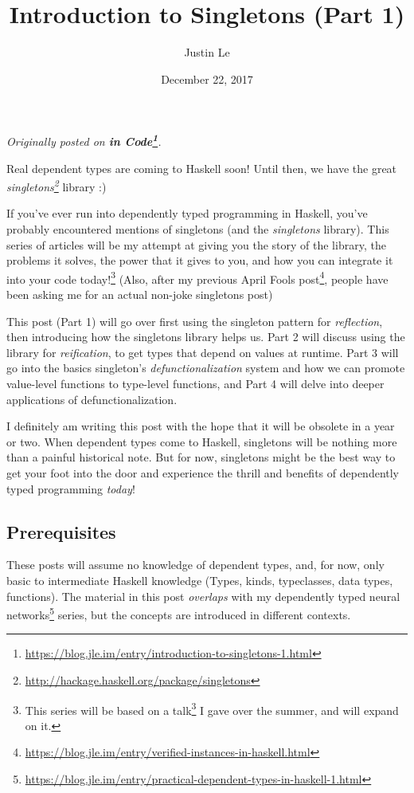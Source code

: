 \documentclass[]{article}
\title{Introduction to Singletons (Part 1)}
\author{Justin Le}
\date{December 22, 2017}
\renewcommand{\href}[2]{#2\footnote{\url{#1}}}
\begin{document}
\maketitle

\emph{Originally posted on
\textbf{\href{https://blog.jle.im/entry/introduction-to-singletons-1.html}{in
Code}}.}

Real dependent types are coming to Haskell soon! Until then, we have the great
\emph{\href{http://hackage.haskell.org/package/singletons}{singletons}} library
:)

If you've ever run into dependently typed programming in Haskell, you've
probably encountered mentions of singletons (and the \emph{singletons} library).
This series of articles will be my attempt at giving you the story of the
library, the problems it solves, the power that it gives to you, and how you can
integrate it into your code today!\footnote{This series will be based on
  \href{http://talks.jle.im/lambdaconf-2017/singletons/}{a talk} I gave over the
  summer, and will expand on it.} (Also, after
\href{https://blog.jle.im/entry/verified-instances-in-haskell.html}{my previous
April Fools post}, people have been asking me for an actual non-joke singletons
post)

This post (Part 1) will go over first using the singleton pattern for
\emph{reflection}, then introducing how the singletons library helps us. Part 2
will discuss using the library for \emph{reification}, to get types that depend
on values at runtime. Part 3 will go into the basics singleton's
\emph{defunctionalization} system and how we can promote value-level functions
to type-level functions, and Part 4 will delve into deeper applications of
defunctionalization.

I definitely am writing this post with the hope that it will be obsolete in a
year or two. When dependent types come to Haskell, singletons will be nothing
more than a painful historical note. But for now, singletons might be the best
way to get your foot into the door and experience the thrill and benefits of
dependently typed programming \emph{today}!

\hypertarget{prerequisites}{%
\subsection{Prerequisites}\label{prerequisites}}

These posts will assume no knowledge of dependent types, and, for now, only
basic to intermediate Haskell knowledge (Types, kinds, typeclasses, data types,
functions). The material in this post \emph{overlaps} with my
\href{https://blog.jle.im/entry/practical-dependent-types-in-haskell-1.html}{dependently
typed neural networks} series, but the concepts are introduced in different
contexts.
\end{document}
